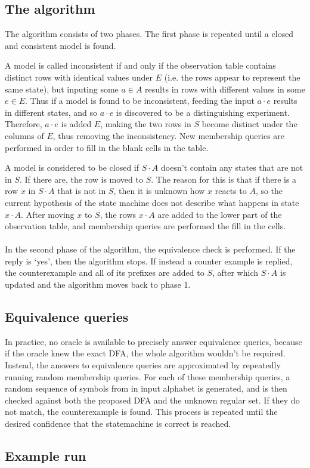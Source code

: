 \documentclass[multi,crop=false,class=article]{standalone}
\newcommand{\concat}{\cdot}
\begin{document}
\subsection {The algorithm}

The algorithm consists of two phases. The first phase is repeated until a closed
and consistent model is found.

A model is called inconsistent if and only if the observation table contains
distinct rows with identical values under $E$ (i.e. the rows appear to represent
the same state), but inputing some $a \in A$ results in rows with different
values in some $e \in E$. Thus if a model is found to be inconsistent, feeding
the input $a \concat e$ results in different states, and so $a \concat e$ is
discovered to be a distinguishing experiment. Therefore, $a \concat e$ is added
$E$, making the two rows in $S$ become distinct under the columns of $E$, thus
removing the inconsistency. New membership queries are performed in order to
fill in the blank cells in the table.

A model is considered to be closed if $S \concat A$ doesn't contain any states
that are not in $S$. If there are, the row is moved to $S$. The reason for this
is that if there is a row $x$ in $S \concat A$ that is not in $S$, then it is
unknown how $x$ reacts to $A$, so the current hypothesis of the state machine
does not describe what happens in state $x \concat A$. After moving $x$ to $S$,
the rows $x \concat A$ are added to the lower part of the observation table, and
membership queries are performed the fill in the cells. 
\\\\
In the second phase of the algorithm, the equivalence check is
performed. If the reply is `yes', then the algorithm stops. If instead a counter
example is replied, the counterexample and all of its prefixes are added to $S$,
after which $S \concat A$ is updated and the algorithm moves back to phase 1.

\subsection {Equivalence queries}

In practice, no oracle is available to precisely answer equivalence queries,
because if the oracle knew the exact DFA, the whole algorithm wouldn't be
required. Instead, the answers to equivalence queries are approximated by
repeatedly running random membership queries. For each of these membership
queries, a random sequence of symbols from in input alphabet is generated, and
is then checked against both the proposed DFA and the unknown regular set. If
they do not match, the counterexample is found. This process is repeated until
the desired confidence that the statemachine is correct is reached.

\subsection {Example run}
\end{document}
